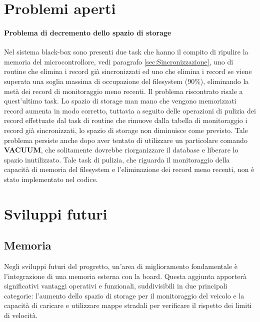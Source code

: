 \documentclass[12pt, a4paper, italian]{report}
\numberwithin{figure}{chapter}
\numberwithin{table}{chapter}
\begin{document}
\section{Problemi aperti}
\paragraph{Problema di decremento dello spazio di storage}
Nel sistema black-box sono presenti due task che hanno il compito di ripulire la memoria del microcontrollore, vedi paragrafo \ref{sec:Sincronizzazione}, uno di routine che elimina i record già sincronizzati ed uno che elimina i record se viene superata una soglia massima di occupazione del filesystem (90\%), eliminando la metà dei record di monitoraggio meno recenti. Il problema riscontrato risale a quest'ultimo task. Lo spazio di storage man mano che vengono memorizzati record aumenta in modo corretto, tuttavia a seguito delle operazioni di pulizia dei record effettuate dal task di routine che rimuove dalla tabella di monitoraggio i record già sincronizzati, lo spazio di storage non diminuisce come previsto. Tale problema persiste anche dopo aver tentato di utilizzare un particolare comando \textbf{VACUUM}, che solitamente dovrebbe riorganizzare il database e liberare lo spazio inutilizzato. 
Tale task di pulizia, che riguarda il monitoraggio della capacità di memoria del filesystem e l'eliminazione dei record meno recenti, non è stato implementato nel codice.

\section{Sviluppi futuri}
\subsection{Memoria}
Negli sviluppi futuri del progretto, un'area di miglioramento fondamentale è l'integrazione di una memoria esterna con la board. Questa aggiunta apporterà significativi vantaggi operativi e funzionali, suddivisibili in due principali categorie: l'aumento dello spazio di storage per il monitoraggio del veicolo e la capacità di caricare e utilizzare mappe stradali per verificare il rispetto dei limiti di velocità.
\end{document}
